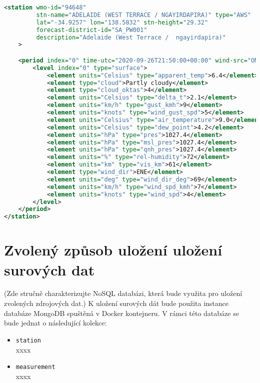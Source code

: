 \documentclass[11pt,a4paper,titlepage]{extarticle}
\begin{document}
\begin{lstlisting}[language=XML]
<station wmo-id="94648"
         stn-name="ADELAIDE (WEST TERRACE / NGAYIRDAPIRA)" type="AWS"
         lat="-34.9257" lon="138.5832" stn-height="29.32"
         forecast-district-id="SA_PW001"
         description="Adelaide (West Terrace /  ngayirdapira)"
    >

    <period index="0" time-utc="2020-09-26T21:50:00+00:00" wind-src="OMD">
        <level index="0" type="surface">
            <element units="Celsius" type="apparent_temp">6.4</element>
            <element type="cloud">Partly cloudy</element>
            <element type="cloud_oktas">4</element>
            <element units="Celsius" type="delta_t">2.1</element>
            <element units="km/h" type="gust_kmh">9</element>
            <element units="knots" type="wind_gust_spd">5</element>
            <element units="Celsius" type="air_temperature">9.0</element>
            <element units="Celsius" type="dew_point">4.2</element>
            <element units="hPa" type="pres">1027.4</element>
            <element units="hPa" type="msl_pres">1027.4</element>
            <element units="hPa" type="qnh_pres">1027.4</element>
            <element units="%" type="rel-humidity">72</element>
            <element units="km" type="vis_km">61</element>
            <element type="wind_dir">ENE</element>
            <element units="deg" type="wind_dir_deg">69</element>
            <element units="km/h" type="wind_spd_kmh">7</element>
            <element units="knots" type="wind_spd">4</element>
        </level>
    </period>
</station>
\end{lstlisting}

\section{Zvolený způsob uložení uložení surových dat}
(Zde stručně charakterizujte NoSQL databázi, která bude využita pro uložení zvolených zdrojových dat.) 
K uložení surových dát bude použita instance databáze MongoDB spuštěná v Docker kontejneru. 
V rámci této databáze se bude jednat o následující kolekce:
\begin{itemize}
	\item \texttt{station} \\
	xxxx
	\item \texttt{measurement} \\
	xxxx
\end{itemize}
\end{document}
